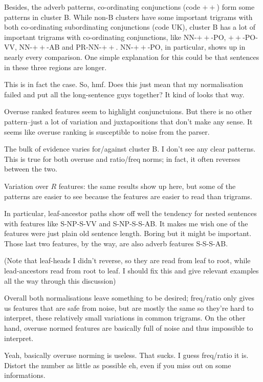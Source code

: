 Besides, the adverb patterns, co-ordinating conjunctions (code $++$)
form some patterns in cluster B. While non-B clusters have some
important trigrams with both co-ordinating subordinating conjunctions
(code UK), cluster B has a lot of important trigrams with
co-ordinating conjunctions, like NN-$++$-PO, $++$-PO-VV, NN-$++$-AB
and PR-NN-$++$. NN-$++$-PO, in particular, shows up in nearly every
comparison. One simple explanation for this could be that sentences in
these three regions are longer.

This is in fact the case. So,
hmf. Does this just mean that my normalisation failed and put all the
long-sentence guys together? It kind of looks that way.

Overuse ranked features seem to highlight conjunctuions. But there is
no other pattern--just a lot of variation and juxtapositions that
don't make any sense. It seems like overuse ranking is susceptible to
noise from the parser.

The bulk of evidence varies for/against cluster B. I don't see any
clear patterns. This is true for both overuse and ratio/freq norms; in
fact, it often reverses between the two.

Variation over $R$ features:  the same results show up here, but some
of the patterns are easier to see because the features are easier to
read than trigrams.

In particular, leaf-ancestor paths show off well the tendency for
nested sentences with features like S-NP-S-VV and S-NP-S-S-AB. It
makes me wish one of the features were just plain old sentence
length. Boring but it might be important. Those last two features, by the
way, are also adverb features S-S-S-AB.

(Note that leaf-heads I didn't reverse, so they are read from leaf to
root, while lead-ancestors read from root to leaf. I should fix this
and give relevant examples all the way through this discussion)

Overall both normalisations leave something to be desired; freq/ratio
only gives us features that are safe from noise, but are mostly the
same so they're hard to interpret, these relatively small variations
in common trigrams. On the other hand, overuse normed features are
basically full of noise and thus impossible to interpret.

Yeah, basically overuse norming is useless. That sucks. I guess
freq/ratio it is. Distort the number as little as possible eh, even if
you miss out on some informations.

